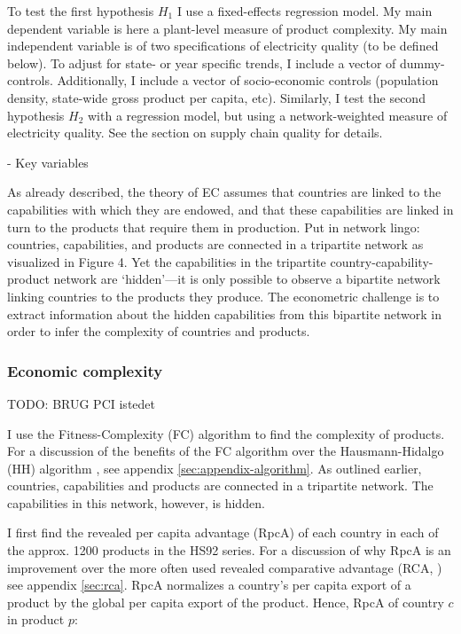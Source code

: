 \documentclass[11pt]{article}
\begin{document}
To test the first hypothesis \(H_1\) I use a fixed-effects regression model. My main dependent variable is here a plant-level measure of product complexity. My main independent variable is of two specifications of electricity quality (to be defined below). To adjust for state- or year specific trends, I include a vector of dummy-controls. Additionally, I include a vector of socio-economic controls (population density, state-wide gross product per capita, etc). Similarly, I test the second hypothesis \(H_2\) with a regression model, but using a network-weighted measure of electricity quality. See the section on supply chain quality for details.

 - Key variables

As already described, the theory of EC assumes that countries are linked to the capabilities with which they are endowed, and that these capabilities are linked in turn to the products that require them in production. Put in network lingo: countries, capabilities, and products are connected in a tripartite network as visualized in Figure 4. Yet the capabilities in the tripartite country-capability-product network are ‘hidden’—it is only possible to observe a bipartite network linking countries to the products they produce. The econometric challenge is to extract information about the hidden capabilities from this bipartite network in order to infer the complexity of countries and products.


\subsubsection{Economic complexity}%
\label{sub:economic_complexity}

TODO: BRUG PCI istedet


    I use the Fitness-Complexity (FC) algorithm \citep{tacchella_new_2012} to find the complexity of products. For a discussion of the benefits of the FC algorithm over the  Hausmann-Hidalgo (HH) algorithm \citep{hidalgo_building_2009}, see appendix \ref{sec:appendix-algorithm}. As outlined earlier, countries, capabilities and products are connected in a tripartite network. The capabilities in this network, however, is hidden.

I first find the revealed per capita advantage (RpcA) of each country in each of the approx. 1200 products in the HS92 series. For a discussion of why RpcA is an improvement over the more often used revealed comparative advantage (RCA, \citealp{balassa_trade_1965}) see appendix \ref{sec:rca}. RpcA normalizes a country's per capita export of a product by the global per capita export of the product. Hence, RpcA of country \(c\) in product \(p\):
\end{document}
